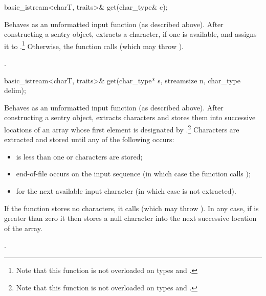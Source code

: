 %
\begin{itemdecl}
basic_istream<charT, traits>& get(char_type& c);
\end{itemdecl}

\begin{itemdescr}
\pnum
\effects
Behaves as an unformatted input function
(as described above).
After constructing a sentry object, extracts
a character, if one is available, and assigns it to .\footnote{Note
that this function is not overloaded on types
and
.}
Otherwise, the function calls
(which may throw
).

\pnum
\returns
{}.
\end{itemdescr}

%
\begin{itemdecl}
basic_istream<charT, traits>& get(char_type* s, streamsize n, char_type delim);
\end{itemdecl}

\begin{itemdescr}
\pnum
\effects
Behaves as an unformatted input function
(as described above).
After constructing a sentry object, extracts
characters and stores them
into successive locations of an array whose first element is designated by
.\footnote{Note that this function is not overloaded on types
and
.}
Characters are extracted and stored until any of the following occurs:
\begin{itemize}
\item
{} is less than one or 
characters are stored;
\item
end-of-file occurs on the input sequence
(in which case the function calls
);
\item
{}
for the next available input
character 
(in which case  is not extracted).
\end{itemize}

\pnum
If the function stores no characters, it calls
(which may throw
).
In any case, if  is greater than zero it then stores a null character
into the next successive location of the array.

\pnum
\returns
{}.
\end{itemdescr}


